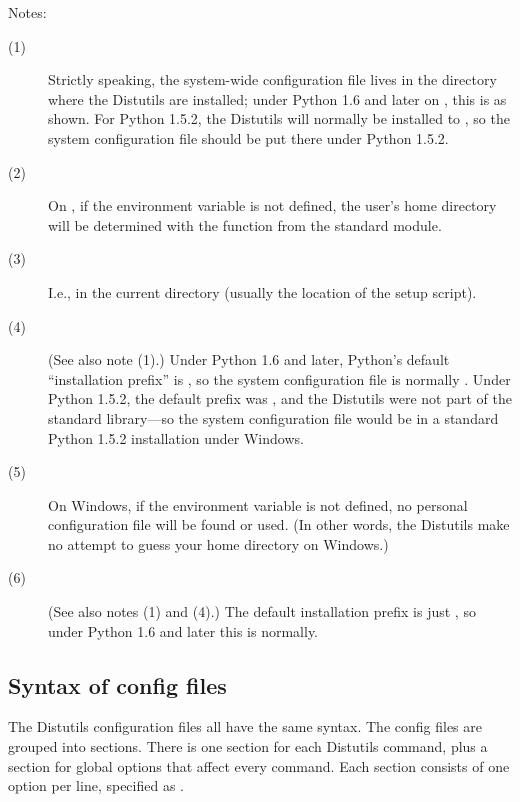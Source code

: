 \documentclass{howto}
\begin{document}
\noindent Notes:
\begin{description}
\item[(1)] Strictly speaking, the system-wide configuration file lives
  in the directory where the Distutils are installed; under Python 1.6
  and later on \UNIX, this is as shown. For Python 1.5.2, the Distutils
  will normally be installed to
  ,
  so the system configuration file should be put there under Python
  1.5.2.
\item[(2)] On \UNIX, if the  environment variable is not
  defined, the user's home directory will be determined with the
   function from the standard
   module.
\item[(3)] I.e., in the current directory (usually the location of the
  setup script).
\item[(4)] (See also note (1).)  Under Python 1.6 and later, Python's
  default ``installation prefix'' is , so
  the system configuration file is normally
  .
  Under Python 1.5.2, the default prefix was
  , and the
  Distutils were not part of the standard library---so the system
  configuration file would be
  in a standard Python 1.5.2 installation under Windows.
\item[(5)] On Windows, if the  environment variable is not
  defined, no personal configuration file will be found or used.  (In
  other words, the Distutils make no attempt to guess your home
  directory on Windows.)
\item[(6)] (See also notes (1) and (4).)  The default installation
  prefix is just , so under Python 1.6 and later this is
  normally.  
\end{description}


\subsection{Syntax of config files}
\label{config-syntax}

The Distutils configuration files all have the same syntax.  The config
files are grouped into sections.  There is one section for each Distutils
command, plus a  section for global options that affect
every command.  Each section consists of one option per line, specified
as .
\end{document}
